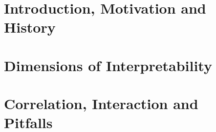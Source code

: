 \documentclass[11pt,compress,t,notes=noshow, aspectratio=169, xcolor=table]{beamer}
\newcommand{\pathiml}{../}
\begin{document}


\section{Introduction, Motivation and History}


\section{Dimensions of Interpretability}


\section{Correlation, Interaction and Pitfalls}


% 
%
% 
\end{document}
